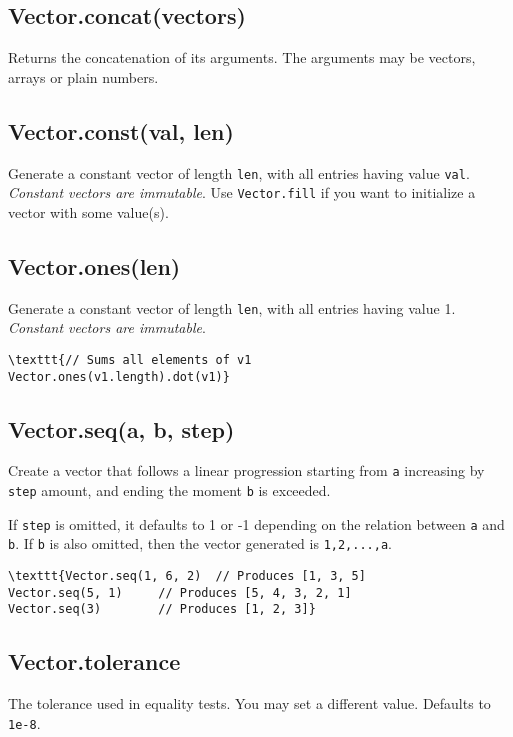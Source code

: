 \documentclass{article}
\begin{document}
    \subsection*{Vector.concat(vectors)}
    Returns the concatenation of its arguments. The arguments may be vectors, arrays
or plain numbers.


    \subsection*{Vector.const(val, len)}
    Generate a constant vector of length \texttt{len}, with all entries having value \texttt{val}.
\emph{Constant vectors are immutable}. Use \texttt{Vector.fill} if you want to initialize a
vector with some value(s).


    \subsection*{Vector.ones(len)}
    Generate a constant vector of length \texttt{len}, with all entries having value 1.
\emph{Constant vectors are immutable}.


\begin{lstlisting}
\texttt{// Sums all elements of v1
Vector.ones(v1.length).dot(v1)}\end{lstlisting}

    \subsection*{Vector.seq(a, b, step)}
    Create a vector that follows a linear progression starting from \texttt{a} increasing
by \texttt{step} amount, and ending the moment \texttt{b} is exceeded.


If \texttt{step} is omitted, it defaults to 1 or -1 depending on the relation between
\texttt{a} and \texttt{b}. If \texttt{b} is also omitted, then the vector generated is \texttt{1,2,...,a}.


\begin{lstlisting}
\texttt{Vector.seq(1, 6, 2)  // Produces [1, 3, 5]
Vector.seq(5, 1)     // Produces [5, 4, 3, 2, 1]
Vector.seq(3)        // Produces [1, 2, 3]}\end{lstlisting}

    \subsection*{Vector.tolerance}
    The tolerance used in equality tests. You may set a different value. Defaults to \texttt{1e-8}.
\end{document}

